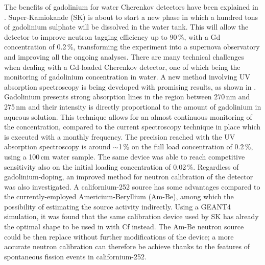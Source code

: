 The benefits of gadolinium for water Cherenkov detectors have been explained in .
Super-Kamiokande (SK) is about to start a new phase in which a hundred tons of gadolinium sulphate %
will be dissolved in the water tank.
This will allow the detector to improve neutron tagging efficiency up to 90\,\%, with a Gd concentration of 0.2\,\%, %
transforming the experiment into a supernova observatory %
and improving all the ongoing analyses.
There are many technical challenges when dealing with a Gd-loaded Cherenkov detector, %
one of which being the monitoring of gadolinium concentration in water.
A new method involving UV absorption spectroscopy is being developed with promising results, %
as shown in .
Gadolinium presents strong absorption lines in the region between 270\,nm and 275\,nm %
and their intensity is directly proportional to the amount of gadolinium in aqueous solution.
This technique allows for an almost continuous monitoring of the concentration, %
compared to the current spectroscopy technique in place which is executed with a monthly frequency.
The precision reached with the UV absorption spectroscopy is around $\sim$1\,\% %
on the full load concentration of 0.2\,\%, using a 100\,cm water sample.
The same device was able to reach competitive sensitivity also on the initial loading concentration of 0.02\,\%.
Regardless of gadolinium-doping, an improved method for neutron calibration of the detector was also investigated.
A californium-252 source has some advantages compared to the currently-employed Americium-Beryllium (Am-Be), %
among which the possibility of estimating the source activity indirectly.
Using a GEANT4 simulation, it was found that the same calibration device used by SK %
has already the optimal shape to be used in with Cf instead.
The Am-Be neutron source could be then replace without further modifications of the device; %
a more accurate neutron calibration can therefore be achieve thanks to the features of spontaneous fission events in californium-252.

